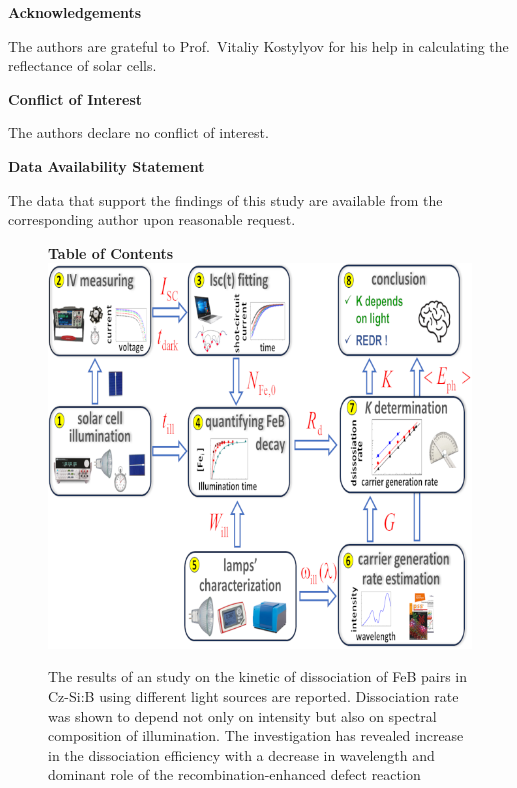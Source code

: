 \documentclass{WileyMSP-template}
\begin{document}
\medskip
\textbf{Acknowledgements} \par %
The authors are grateful to Prof.~Vitaliy Kostylyov for his help in calculating the reflectance of solar cells.

\medskip
\textbf{Conflict of Interest}\par
The authors declare no conflict of interest.

\medskip
\textbf{Data Availability Statement}\par
The data that support the findings of this study are available from the corresponding author upon reasonable request.
\medskip






%
%
\begin{figure}
\textbf{Table of Contents}\\
\medskip
  \includegraphics{toc-image.png}
  \medskip
  \caption*{The results of an study on the kinetic of dissociation of FeB pairs in Cz-Si:B using different light sources are reported.
Dissociation rate was shown to depend not only on intensity but also on spectral composition of illumination.
The investigation has revealed increase in the dissociation efficiency with a decrease in wavelength and dominant role of the recombination-enhanced defect reaction}
\end{figure}
\end{document}

